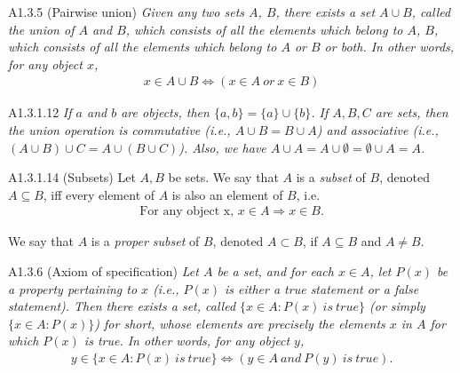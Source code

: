 \begin{axiom}{A1.3.5}
    (Pairwise union) \emph{Given any two sets $A$, $B$, there exists a set $A\cup B$, called the union of $A$ and $B$, which consists of all the elements which belong to $A$, $B$, which consists of all the elements which belong to $A$ or $B$ or both. In other words, for any object $x$,}
    \begin{align*}
        x\in A\cup B \iff (x\in A~or~x\in B)
    \end{align*}
\end{axiom}

\begin{lemma}{A1.3.1.12}
    \emph{If $a$ and $b$ are objects, then $\{a, b\} = \{a\}\cup \{b\}$. If $A, B, C$ are sets, then the union operation
    is commutative  (i.e., $A\cup B = B\cup A$) and associative (i.e., $(A\cup B)\cup C = A\cup (B\cup C)$). Also, we have
    $A\cup A = A\cup \emptyset = \emptyset \cup A = A$.}
\end{lemma}

\begin{definition}{A1.3.1.14}
    (Subsets) Let $A,B$ be sets. We say that $A$ is a \emph{subset} of $B$, denoted $A\subseteq B$, iff every element of $A$ is also an element of $B$, i.e.
    \begin{align*}
        \text{For any object x,~}x\in A \Rightarrow x\in B.
    \end{align*}

    We say that $A$ is a \emph{proper subset} of $B$, denoted $A\subset B$, if $A\subseteq B$ and $A\neq B$.
\end{definition}

\begin{axiom}{A1.3.6}
    (Axiom of specification) \emph{Let $A$ be a set, and for each $x\in A$, let $P(x)$ be a property pertaining to $x$ (i.e., $P(x)$ is either a true statement or a false statement). Then there exists a set, called $\{x\in A: P(x)~is~true\}$ (or simply $\{x\in A: P(x)\}$) for short, whose elements are precisely the elements $x$ in $A$ for which $P(x)$ is true. In other words, for any object $y$,}\begin{align*}
        y\in \{x\in A: P(x)~is~true\} \iff (y\in A~and~P(y)~is~true).
    \end{align*}
\end{axiom}

